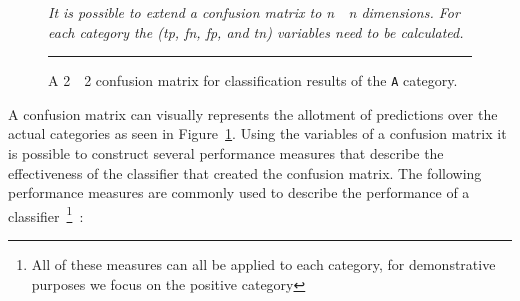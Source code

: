 \begin{figure}[t!]
  \centering
  \caption{A 2~\times~2 confusion matrix for classification results of the \texttt{A} category.}
  \vspace{1mm}
  \footnotesize{\emph{It is possible to extend a confusion matrix to n~\times~n dimensions. For each category the (\gls{tp}, \gls{fn}, \gls{fp}, and \gls{tn}) variables need to be calculated.}}
  \vspace{2mm}
  \hrule
  \label{fig:example_confusion_matrix}
\end{figure}

A confusion matrix can visually represents the allotment of predictions over the actual categories as seen in Figure~\ref{fig:example_confusion_matrix}. Using the variables of a confusion matrix it is possible to construct several performance measures that describe the effectiveness of the classifier that created the confusion matrix. The following performance measures are commonly used to describe the performance of a classifier~\footnote{All of these measures can all be applied to each category, for demonstrative purposes we focus on the positive category}~\cite{SJS06}:

